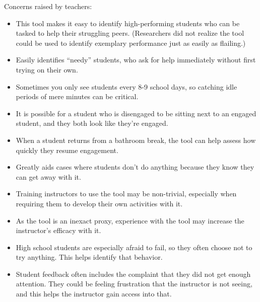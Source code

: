 Concerns raised by teachers: 
\begin{itemize}
\item This tool makes it easy to identify high-performing students who can be tasked to help their struggling peers. (Researchers did not realize the tool could be used to identify exemplary performance just as easily as flailing.)
\item Easily identifies ``needy'' students, who ask for help immediately without first trying on their own. %
\item Sometimes you only see students every 8-9 school days, so catching idle periods of mere minutes can be critical. 
\item It is possible for a student who is disengaged to be sitting next to an engaged student, and they both look like they're engaged.
\item When a student returns from a bathroom break, the tool can help assess how quickly they resume engagement.
\item Greatly aids cases where students don't do anything because they know they can get away with it.
\item Training instructors to use the tool may be non-trivial, especially when requiring them to develop their own activities with it. 
\item As the tool is an inexact proxy, experience with the tool may increase the instructor's efficacy with it.
\item High school students are especially afraid to fail, so they often choose not to try anything. This helps identify that behavior.
\item Student feedback often includes the complaint that they did not get enough attention. They could be feeling frustration that the instructor is not seeing, and this helps the instructor gain access into that.
\end{itemize}


